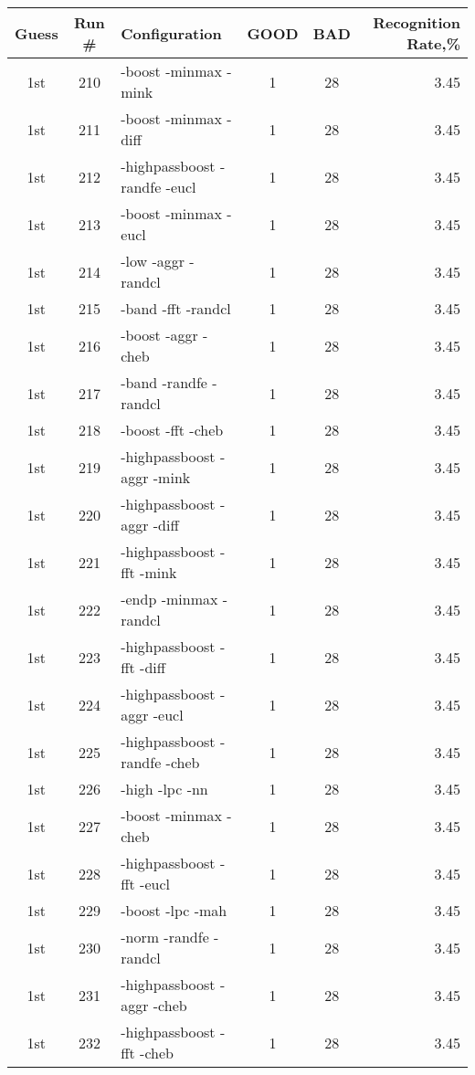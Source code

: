 \begin{table}
\begin{minipage}[b]{\textwidth}
\centering
\begin{tabular}{|c|c|l|c|c|r|} \hline
Guess & Run \# & Configuration & GOOD & BAD & Recognition Rate,\%\\ \hline\hline
1st & 210 & -boost -minmax -mink  & 1 & 28 & 3.45\\ \hline
1st & 211 & -boost -minmax -diff  & 1 & 28 & 3.45\\ \hline
1st & 212 & -highpassboost -randfe -eucl  & 1 & 28 & 3.45\\ \hline
1st & 213 & -boost -minmax -eucl  & 1 & 28 & 3.45\\ \hline
1st & 214 & -low -aggr -randcl  & 1 & 28 & 3.45\\ \hline
1st & 215 & -band -fft -randcl  & 1 & 28 & 3.45\\ \hline
1st & 216 & -boost -aggr -cheb  & 1 & 28 & 3.45\\ \hline
1st & 217 & -band -randfe -randcl  & 1 & 28 & 3.45\\ \hline
1st & 218 & -boost -fft -cheb  & 1 & 28 & 3.45\\ \hline
1st & 219 & -highpassboost -aggr -mink  & 1 & 28 & 3.45\\ \hline
1st & 220 & -highpassboost -aggr -diff  & 1 & 28 & 3.45\\ \hline
1st & 221 & -highpassboost -fft -mink  & 1 & 28 & 3.45\\ \hline
1st & 222 & -endp -minmax -randcl  & 1 & 28 & 3.45\\ \hline
1st & 223 & -highpassboost -fft -diff  & 1 & 28 & 3.45\\ \hline
1st & 224 & -highpassboost -aggr -eucl  & 1 & 28 & 3.45\\ \hline
1st & 225 & -highpassboost -randfe -cheb  & 1 & 28 & 3.45\\ \hline
1st & 226 & -high -lpc -nn  & 1 & 28 & 3.45\\ \hline
1st & 227 & -boost -minmax -cheb  & 1 & 28 & 3.45\\ \hline
1st & 228 & -highpassboost -fft -eucl  & 1 & 28 & 3.45\\ \hline
1st & 229 & -boost -lpc -mah  & 1 & 28 & 3.45\\ \hline
1st & 230 & -norm -randfe -randcl  & 1 & 28 & 3.45\\ \hline
1st & 231 & -highpassboost -aggr -cheb  & 1 & 28 & 3.45\\ \hline
1st & 232 & -highpassboost -fft -cheb  & 1 & 28 & 3.45\\ \hline

\end{tabular}
\end{minipage}
\end{table}
